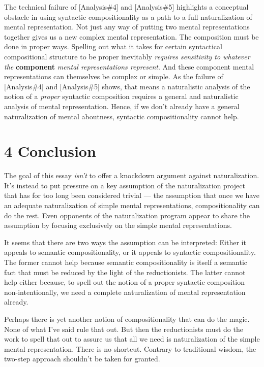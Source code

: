 \documentclass[a4paper,12pt]{article}
\begin{document}
The technical failure of [Analysis\#4] and [Analysis\#5] highlights a conceptual obstacle in using syntactic compositionality as a path to a full naturalization of mental representation. Not just any way of putting two mental representations together gives us a new complex mental representation. The composition must be done in proper ways. Spelling out what it takes for certain syntactical compositional structure to be proper inevitably \emph{requires sensitivity to whatever the} \textbf{component} \emph{mental representations represent}. And these component mental representations can themselves be complex or simple. As the failure of [Analysis\#4] and [Analysis\#5] shows, that means a naturalistic analysis of the notion of a \emph{proper} syntactic composition requires a general and naturalistic analysis of mental representation. Hence, if we don't already have a general naturalization of mental aboutness, syntactic compositionality cannot help.

\section*{4 Conclusion}
The goal of this essay \emph{isn't} to offer a knockdown argument against naturalization. It's instead to put pressure on a key assumption of the naturalization project that has for too long been considered trivial --- the assumption that once we have an adequate naturalization of simple mental representations, compositionality can do the rest. Even opponents of the naturalization program appear to share the assumption by focusing exclusively on the simple mental representations.

It seems that there are two ways the assumption can be interpreted: Either it appeals to semantic compositionality, or it appeals to syntactic compositionality. The former cannot help because semantic compositionality is itself a semantic fact that must be reduced by the light of the reductionists. The latter cannot help either because, to spell out the notion of a proper syntactic composition non-intentionally, we need a complete naturalization of mental representation already.

Perhaps there is yet another notion of compositionality that can do the magic. None of what I've said rule that out. But then the reductionists must do the work to spell that out to assure us that all we need is naturalization of the simple mental representation. There is no shortcut. Contrary to traditional wisdom, the two-step approach shouldn't be taken for granted.

\nocite{fred1981knowledge}
\nocite{fodor2001language}
\nocite{fodor1990theory}
\nocite{fodor1987psychosemantics}
\nocite{millikan1984language}
\nocite{papineau1987representation}
\nocite{robbins2002blunt}
\nocite{ryder2004sinbad}



\end{document}
